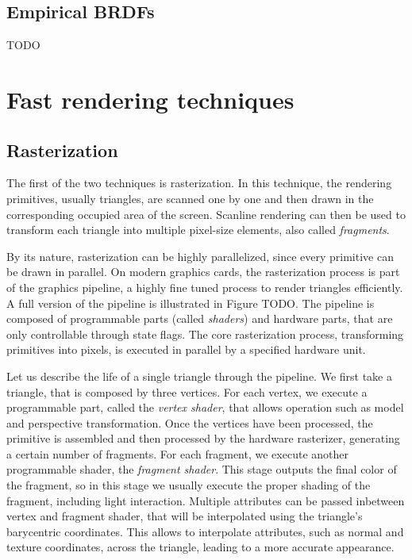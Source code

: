 \subsection{Empirical BRDFs}
TODO

\section{Fast rendering techniques} 
\subsection{Rasterization}
The first of the two techniques is rasterization. In this technique, the rendering primitives, usually triangles, are scanned one by one and then drawn in the corresponding occupied area of the screen. Scanline rendering can then be used to transform each triangle into multiple pixel-size elements, also called \emph{fragments}. 

By its nature, rasterization can be highly parallelized, since every primitive can be drawn in parallel. On modern graphics cards, the rasterization process is part of the graphics pipeline, a highly fine tuned process to render triangles efficiently. A full version of the pipeline is illustrated in Figure TODO. The pipeline is composed of programmable parts (called \emph{shaders}) and hardware parts, that are only controllable through state flags. The core rasterization process, transforming primitives into pixels, is executed in parallel by a specified hardware unit. 

Let us describe the life of a single triangle through the pipeline. We first take a triangle, that is composed by three vertices. For each vertex, we execute a programmable part, called the \emph{vertex shader}, that allows operation such as model and perspective transformation. Once the vertices have been processed, the primitive is assembled and then processed by the hardware rasterizer, generating a certain number of fragments. For each fragment, we execute another programmable shader, the \emph{fragment shader}. This stage outputs the final color of the fragment, so in this stage we usually execute the proper shading of the fragment, including light interaction. Multiple attributes can be passed inbetween vertex and fragment shader, that will be interpolated using the triangle's barycentric coordinates. This allows to interpolate attributes, such as normal and texture coordinates, across the triangle, leading to a more accurate appearance. 

